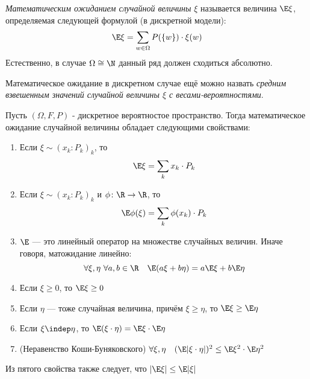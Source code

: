 \begin{definition}
	\textit{Математическим ожиданием случайной величины} $\xi$ называется величина $\E\xi$, определяемая следующей формулой (в дискретной модели):
	\[
		\E\xi = \sum_{w \in \Omega} P(\{w\}) \cdot \xi(w)
	\]
	Естественно, в случае $\Omega \cong \N$ данный ряд должен сходиться абсолютно.
\end{definition}

\begin{anote}
	Математическое ожидание в дискретном случае ещё можно назвать \textit{средним взвешенным значений случайной величины $\xi$ с весами-вероятностями}.
\end{anote}

\begin{theorem}
	Пусть $(\Omega, F, P)$ - дискретное вероятностое пространство. Тогда математическое ожидание случайной величины обладает следующими свойствами:
	\begin{enumerate}
		\item Если $\xi \sim (x_k \colon P_k)_k$, то
		\[
			\E\xi = \sum_k x_k \cdot P_k
		\]
		
		\item Если $\xi \sim (x_k \colon P_k)_k$ и $\phi \colon \R \to \R$, то
		\[
			\E\phi(\xi) = \sum_k \phi(x_k) \cdot P_k
		\]
		
		\item $\E$ --- это линейный оператор на множестве случайных величин. Иначе говоря, матожидание линейно:
		\[
			\forall \xi, \eta\ \forall a, b \in \R \quad \E(a\xi + b\eta) = a\E\xi + b\E\eta
		\]
		
		\item Если $\xi \ge 0$, то $\E\xi \ge 0$
		
		\item Если $\eta$ --- тоже случайная величина, причём $\xi \ge \eta$, то $\E\xi \ge \E\eta$
		
		\item Если $\xi \indep \eta$, то $\E(\xi \cdot \eta) = \E\xi \cdot \E\eta$
		
		\item (Неравенство Коши-Буняковского) \(\forall \xi, \eta \quad (\E|\xi \cdot \eta|)^2 \le \E\xi^2 \cdot \E\eta^2\)
	\end{enumerate}
\end{theorem}

\begin{note}
	Из пятого свойства также следует, что $|\E\xi| \le \E|\xi|$
\end{note}

